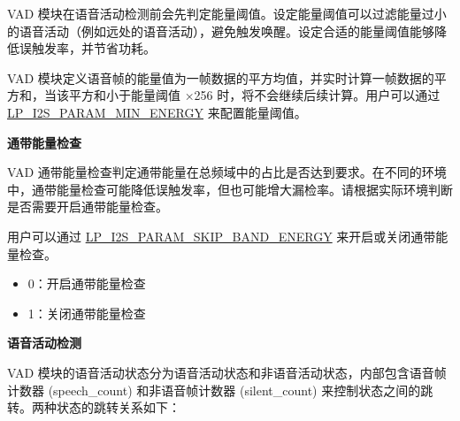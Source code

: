 \documentclass[main\_\_CN.tex]{subfiles}
\begin{document}
VAD 模块在语音活动检测前会先判定能量阈值。设定能量阈值可以过滤能量过小的语音活动（例如远处的语音活动），避免触发唤醒。设定合适的能量阈值能够降低误触发率，并节省功耗。

VAD 模块定义语音帧的能量值为一帧数据的平方均值，并实时计算一帧数据的平方和，当该平方和小于能量阈值 ×256 时，将不会继续后续计算。用户可以通过 \hyperref[fielddesc:LPI2SPARAMMINENERGY]{LP\_I2S\_PARAM\_MIN\_ENERGY} 来配置能量阈值。



\textbf{通带能量检查}

VAD 通带能量检查判定通带能量在总频域中的占比是否达到要求。在不同的环境中，通带能量检查可能降低误触发率，但也可能增大漏检率。请根据实际环境判断是否需要开启通带能量检查。

用户可以通过 \hyperref[fielddesc:LPI2SPARAMSKIPBANDENERGY]{LP\_I2S\_PARAM\_SKIP\_BAND\_ENERGY} 来开启或关闭通带能量检查。

\begin{itemize}
    \item 0：开启通带能量检查
    \item 1：关闭通带能量检查
\end{itemize}


\textbf{语音活动检测}

VAD 模块的语音活动状态分为语音活动状态和非语音活动状态，内部包含语音帧计数器 (speech\_count) 和非语音帧计数器 (silent\_count) 来控制状态之间的跳转。两种状态的跳转关系如下：
\end{document}
